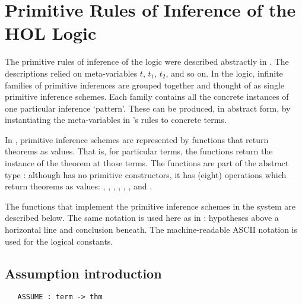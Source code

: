 \section{Primitive Rules of Inference of the HOL Logic}
\label{rules}

%
The primitive rules of inference of the logic were described
abstractly in \LOGIC. The descriptions relied on meta-variables $t$,
$t_1$, $t_2$, and so on.  In the \HOL{} logic, infinite families of
primitive inferences are grouped together and thought of as single
primitive inference schemes. %
%
%
Each family contains all the concrete instances of one particular
inference `pattern'. These can be produced, in abstract form, by
instantiating the meta-variables in \LOGIC{}'s rules to concrete
terms.

In \HOL, primitive inference schemes are represented by \ML{} functions
that return theorems as values.  That is, for particular \HOL{} terms,
the \ML{} functions return the instance of the theorem at those terms.
The \ML{} functions are part of the \ML{} abstract type
:
%
%
although  has no primitive constructors, it has (eight)
operations which return theorems as values: , ,
, , , ,  and
.
%

The \ML{} functions that implement the primitive inference schemes in the
\HOL{} system are described below.  The same notation
%
%
is used here as in \LOGIC: hypotheses above a horizontal line and
conclusion
%
 beneath. The machine-readable
{\small ASCII} notation is used for the logical constants.

\subsection{Assumption introduction}
%

\begin{holboxed}
\begin{verbatim}
   ASSUME : term -> thm
\end{verbatim}\end{holboxed}

